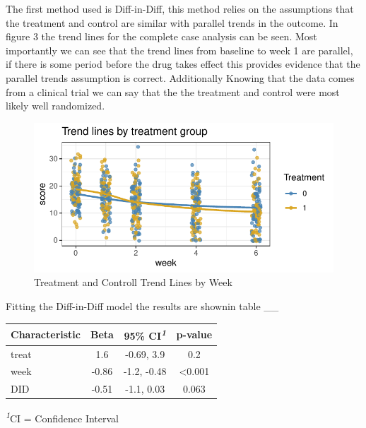 \documentclass[
]{article}
\begin{document}
The first method used is Diff-in-Diff, this method relies on the
assumptions that the treatment and control are similar with parallel
trends in the outcome. In figure 3 the trend lines for the complete case
analysis can be seen. Most importantly we can see that the trend lines
from baseline to week 1 are parallel, if there is some period before the
drug takes effect this provides evidence that the parallel trends
assumption is correct. Additionally Knowing that the data comes from a
clinical trial we can say that the the treatment and control were most
likely well randomized.

\newpage
\begin{figure}

{\centering \includegraphics{missingness_in_causal_inference_files/figure-latex/unnamed-chunk-4-1} 

}

\caption{Treatment and Controll Trend Lines by Week}\label{fig:unnamed-chunk-4}
\end{figure}

Fitting the Diff-in-Diff model the results are shownin table \_\_

\begin{table}[!t]
\fontsize{12.0pt}{14.4pt}\selectfont
\begin{tabular*}{\linewidth}{@{\extracolsep{\fill}}lccc}
\toprule
\textbf{Characteristic} & \textbf{Beta} & \textbf{95\% CI}\textsuperscript{\textit{1}} & \textbf{p-value} \\ 
\midrule\addlinespace[2.5pt]
treat & 1.6 & -0.69, 3.9 & 0.2 \\ 
week & -0.86 & -1.2, -0.48 & <0.001 \\ 
DID & -0.51 & -1.1, 0.03 & 0.063 \\ 
\bottomrule
\end{tabular*}
\begin{minipage}{\linewidth}
\textsuperscript{\textit{1}}CI = Confidence Interval\\
\end{minipage}
\end{table}
\end{document}
